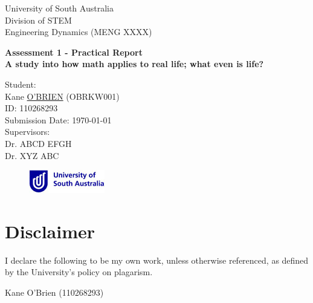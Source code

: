 \begin{titlepage}
\centering
{\Large University of South Australia\\Division of STEM\\[1\baselineskip]}
{\Huge Engineering Dynamics (MENG XXXX)\\}
{\Huge \textbf{Assessment 1 - Practical Report} \\[4\baselineskip]\vfill
{\Huge \textbf{A study into how math applies to real life; what even is life?}}
\par\vfill
{\Large Student:\\}
{\Large Kane \underline{O'BRIEN} (OBRKW001)\\ID: 110268293\\}
\vspace*{4\baselineskip}
{\Large Submission Date: \today \\}
\vspace*{\baselineskip}
{\large Supervisors:\\}
{\Large Dr. ABCD EFGH\\ \vspace{1mm} Dr. XYZ ABC}
\begin{figure}[b]\raggedleft \includegraphics{images/UniSAlogo}\end{figure}}
\end{titlepage}
\clearpage
\section*{Disclaimer}
\setlength{\baselineskip}{1.5em}
I declare the following to be my own work, unless otherwise referenced, as defined by the University's policy on plagarism.
\begin{flushright}Kane O'Brien (110268293)\\\vspace*{\baselineskip}\end{flushright}
\clearpage
